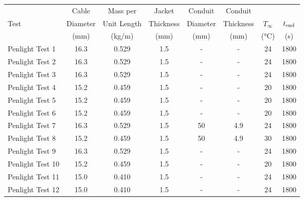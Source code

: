 \begin{table}[!ht]
\begin{center}
\begin{tabular}{|l|c|c|c|c|c|c|c|}
\hline
                  &  Cable     &  Mass per     &  Jacket     &  Conduit   &  Conduit    &                   &               \\
Test              &  Diameter  &  Unit Length  &  Thickness  &  Diameter  &  Thickness  &  $T_\infty$       &  $t\sb{end}$  \\
                  &  (mm)      &  (kg/m)       &  (mm)       &  (mm)      &  (mm)       &  (\si{\celsius})  &  (s)          \\ \hline \hline
Penlight Test 1   &  16.3      &  0.529        &  1.5        &  -         &  -          &  24               &  1800         \\ \hline
Penlight Test 2   &  16.3      &  0.529        &  1.5        &  -         &  -          &  24               &  1800         \\ \hline
Penlight Test 3   &  16.3      &  0.529        &  1.5        &  -         &  -          &  24               &  1800         \\ \hline
Penlight Test 4   &  15.2      &  0.459        &  1.5        &  -         &  -          &  20               &  1800         \\ \hline
Penlight Test 5   &  15.2      &  0.459        &  1.5        &  -         &  -          &  20               &  1800         \\ \hline
Penlight Test 6   &  15.2      &  0.459        &  1.5        &  -         &  -          &  20               &  1800         \\ \hline
Penlight Test 7   &  16.3      &  0.529        &  1.5        &  50        &  4.9        &  24               &  1800         \\ \hline
Penlight Test 8   &  15.2      &  0.459        &  1.5        &  50        &  4.9        &  30               &  1800         \\ \hline
Penlight Test 9   &  16.3      &  0.529        &  1.5        &  -         &  -          &  24               &  1800         \\ \hline
Penlight Test 10  &  15.2      &  0.459        &  1.5        &  -         &  -          &  20               &  1800         \\ \hline
Penlight Test 11  &  15.0      &  0.410        &  1.5        &  -         &  -          &  24               &  1800         \\ \hline
Penlight Test 12  &  15.0      &  0.410        &  1.5        &  -         &  -          &  24               &  1800         \\ \hline

\end{tabular}
\end{center}
\end{table}
